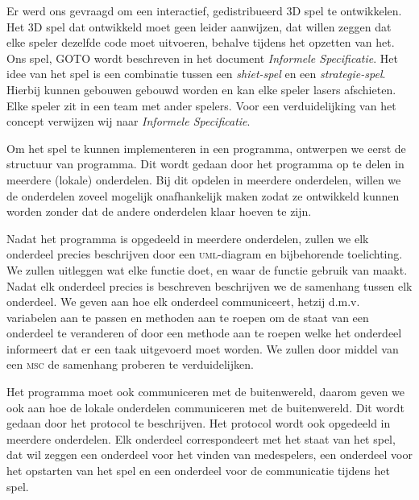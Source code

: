 Er werd ons gevraagd om een interactief, gedistribueerd 3D spel te ontwikkelen. Het 3D spel dat ontwikkeld moet geen leider aanwijzen, dat willen zeggen dat elke speler dezelfde code moet uitvoeren, behalve tijdens het opzetten van het. Ons spel, \textsc{GOTO} wordt beschreven in het document \emph{Informele Specificatie}. Het idee van het spel is een combinatie tussen een \emph{shiet-spel} en een \emph{strategie-spel}. Hierbij kunnen gebouwen gebouwd worden en kan elke speler lasers afschieten. Elke speler zit in een team met ander spelers. Voor een verduidelijking van het concept verwijzen wij naar \emph{Informele Specificatie}.

Om het spel te kunnen implementeren in een programma, ontwerpen we eerst de structuur van programma. Dit wordt gedaan door het programma op te delen in meerdere (lokale) onderdelen. Bij dit opdelen in meerdere onderdelen, willen we de onderdelen zoveel mogelijk onafhankelijk maken zodat ze ontwikkeld kunnen worden zonder dat de andere onderdelen klaar hoeven te zijn.

Nadat het programma is opgedeeld in meerdere onderdelen, zullen we elk onderdeel precies beschrijven door een \textsc{uml}-diagram en bijbehorende toelichting. We zullen uitleggen wat elke functie doet, en waar de functie gebruik van maakt. Nadat elk onderdeel precies is beschreven beschrijven we de samenhang tussen elk onderdeel. We geven aan hoe elk onderdeel communiceert, hetzij d.m.v. variabelen aan te passen en methoden aan te roepen om de staat van een onderdeel te veranderen of door een methode aan te roepen welke het onderdeel informeert dat er een taak uitgevoerd moet worden. We zullen door middel van een \textsc{msc} de samenhang proberen te verduidelijken.

Het programma moet ook communiceren met de buitenwereld, daarom geven we ook aan hoe de lokale onderdelen communiceren met de buitenwereld. Dit wordt gedaan door het protocol te beschrijven. Het protocol wordt ook opgedeeld in meerdere onderdelen. Elk onderdeel correspondeert met het staat van het spel, dat wil zeggen een onderdeel voor het vinden van medespelers, een onderdeel voor het opstarten van het spel en een onderdeel voor de communicatie tijdens het spel.
